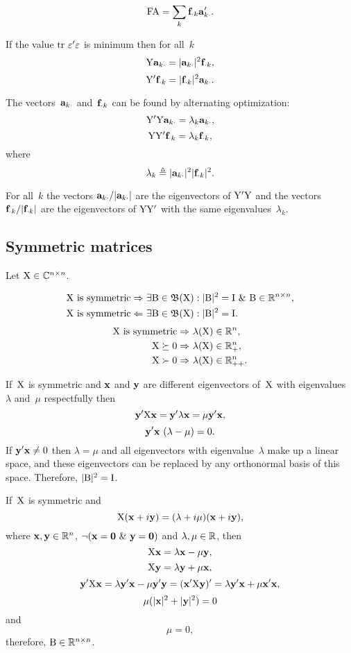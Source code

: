 \documentclass[10pt,a4paper]{article}
\theoremstyle{plain} \newtheorem{Lem}{Lemma}
\begin{document}
$$ \mathrm F \mathrm A = \sum_k \mathbf f_{\cdot k} \mathbf a_{k \cdot}'. $$

If the value $\mathrm {tr} \  \mathrm \varepsilon' \mathrm \varepsilon$ is minimum then for all~$k$
$$\mathrm Y \mathbf a_{k \cdot} = |\mathbf a_{k \cdot}|^2 \mathbf f_{\cdot k}, $$
$$\mathrm Y' \mathbf f_{\cdot k} = |\mathbf f_{\cdot k}|^2 \mathbf a_{k \cdot}.$$

The vectors~$\mathbf a_{k \cdot}$ and~$\mathbf f_{\cdot k}$ can be found by alternating optimization:
$$ \mathrm Y' \mathrm Y \mathbf a_{k \cdot} = \lambda_k \mathbf a_{k \cdot}, $$
$$ \mathrm Y \mathrm Y' \mathbf f_{\cdot k} = \lambda_k \mathbf f_{\cdot k}, $$
where
$$ \lambda_k \triangleq |\mathbf a_{k \cdot}|^2 |\mathbf f_{\cdot k}|^2. $$

For all~$k$
the vectors $\mathbf a_{k \cdot}/|\mathbf a_{k \cdot}|$ are the eigenvectors of $\mathrm Y' \mathrm Y$
and
the vectors $\mathbf f_{\cdot k}/|\mathbf f_{\cdot k}|$ are the eigenvectors of $\mathrm Y \mathrm Y'$
with the same eigenvalues~$\lambda_k$.


\subsection{Symmetric matrices}

Let $\mathrm X \in \mathbb C^{n \times n}$.

\begin{align*}
  \mathrm X \text{ is symmetric} \Rightarrow  & \ \exists \mathrm B \in \mathfrak B(\mathrm X) : |\mathrm B|^2 = \mathrm I \ \& \  \mathrm B \in \mathbb R^{n \times n}, \\
  \mathrm X \text{ is symmetric} \Leftarrow& \ \exists \mathrm B \in \mathfrak B(\mathrm X) : |\mathrm B|^2 = \mathrm I.
\end{align*}
\begin{align*}
 \mathrm X \text{ is symmetric} \Rightarrow& \ \lambda(\mathrm X) \in \mathbb R^n, \\
 \mathrm X \succeq 0 \Rightarrow& \ \lambda(\mathrm X) \in \mathbb R_+^n, \\
 \mathrm X \succ   0 \Rightarrow& \ \lambda(\mathrm X) \in \mathbb R_{++}^n.
\end{align*}

\proof
{
  If~$\mathrm X$ is symmetric and $\mathbf x$ and $\mathbf y$ are different eigenvectors of~$\mathrm X$ with eigenvalues~$\lambda$ and~$\mu$ respectfully
  then
  $$ \mathbf y' \mathrm X \mathbf x = \mathbf y' \lambda \mathbf x = \mu \mathbf y' \mathbf x, $$
  $$ \mathbf y' \mathbf x \ (\lambda - \mu) = 0. $$
  If $\mathbf y' \mathbf x \ne 0$ then $\lambda = \mu$ and all eigenvectors with eigenvalue~$\lambda$ make up a linear space, and these eigenvectors can be replaced by any orthonormal basis of this space.
  Therefore, $|\mathrm B|^2 = \mathrm I$.

  If~$\mathrm X$ is symmetric and
  $$ \mathrm X (\mathbf x + i \mathbf y) = (\lambda + i \mu) (\mathbf x + i \mathbf y), $$
  where $\mathbf x, \mathbf y \in \mathbb R^n$,
  $\neg (\mathbf x = \mathbf 0 \ \& \  \mathbf y = \mathbf 0)$ and $\lambda, \mu \in \mathbb R$,
  then
  $$ \mathrm X \mathbf x = \lambda \mathbf x - \mu \mathbf y, $$
  $$ \mathrm X \mathbf y = \lambda \mathbf y + \mu \mathbf x, $$
  $$ \mathbf y' \mathrm X \mathbf x = \lambda \mathbf y' \mathbf x - \mu \mathbf y' \mathbf y = (\mathbf x' \mathrm X \mathbf y)' = \lambda \mathbf y' \mathbf x + \mu \mathbf x' \mathbf x, $$
  $$ \mu (|\mathbf x|^2 + |\mathbf y|^2) = 0 $$
  and
  $$ \mu = 0, $$
  therefore, $\mathrm B \in \mathbb R^{n \times n}$.
}
\end{document}
